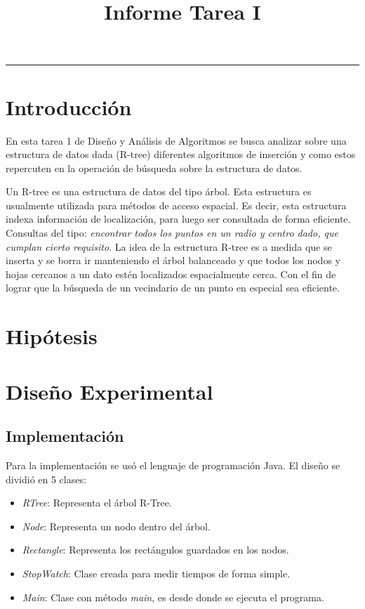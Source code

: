 \documentclass[letterpaper,12pt]{article}
\title{Informe Tarea I}
\makeatletter
\renewcommand{\maketitle}{\begin{titlepage}%
    \let\footnotesize\small
    \let\footnoterule\relax
    \parindent \z@
    \reset@font
    \null\vfil
    \begin{flushleft}    
      \small \@curso \par
      \huge{\textbf{\@title}} \par
    \end{flushleft}
    \par
    \hrule height 4pt
    \par
    \begin{flushright}
      \Huge{\textbf{\@author}} \par
      \bigskip
      \normalsize{\@primerautor} \par
      \normalsize{\@segundoautor} \par
      \bigskip
      \bigskip
      \normalsize \@date \par
    \end{flushright}
    \vskip 60\p@
    \vfil\null
  \end{titlepage}%
  \setcounter{footnote}{0}%
}
\makeatother
\begin{document}
 
\maketitle
 
 
\newpage
\thispagestyle{empty}
\tableofcontents
\setcounter{page}{0}
\newpage
 
\section{Introducci\'on}
En esta tarea 1 de Dise\~no y An\'alisis de Algoritmos se busca analizar sobre una estructura de datos dada (R-tree) diferentes algoritmos de inserci\'on y como estos repercuten en la operaci\'on de b\'usqueda sobre la estructura de datos.
	
Un R-tree es una estructura de datos del tipo \'arbol. Esta estructura es usualmente utilizada para m\'etodos de acceso espacial. Es decir, esta estructura indexa informaci\'on de localizaci\'on, para luego ser consultada de forma eficiente. Consultas del tipo: \textit{encontrar todos los puntos en un radio y centro dado, que cumplan cierto requisito}. La idea de la estructura R-tree es a medida que se inserta y se borra ir manteniendo el \'arbol balanceado y que todos los nodos y hojas cercanos a un dato est\'en localizados espacialmente cerca. Con el fin de lograr que la b\'usqueda de un vecindario de un punto en especial sea eficiente.

\newpage 
\section{Hip\'otesis}


\newpage
\section{Dise\~no Experimental}
\subsection{Implementaci\'on}
Para la implementaci\'on se us\'o el lenguaje de programaci\'on Java. El dise\~no se dividi\'o en 5 clases:

\begin{itemize}
\item \textit{RTree}: Representa el \'arbol R-Tree.
\item \textit{Node}: Representa un nodo dentro del \'arbol.
\item \textit{Rectangle}: Representa los rect\'angulos guardados en los nodos.
\item \textit{StopWatch}: Clase creada para medir tiempos de forma simple.
\item \textit{Main}: Clase con m\'etodo \textit{main}, es desde donde se ejecuta el programa.
\end{itemize}
\end{document}
